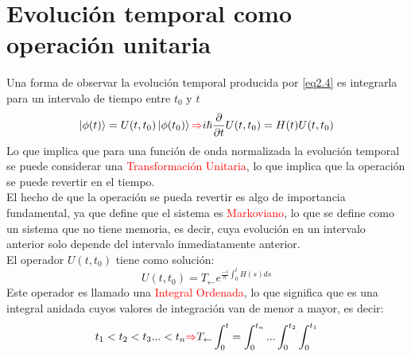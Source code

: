 \documentclass{book}
\begin{document}
\section{Evolución temporal como operación unitaria}
Una forma de observar la evolución temporal producida por \ref{eq2.4} es integrarla para un intervalo de tiempo entre $t_0$ y $t$
\begin{equation}\label{eq2.5}\ket{\phi(t)}=U(t,t_0)\ket{\phi(t_0)}\textcolor{red}{\Rightarrow} i \hslash \frac{\partial}{\partial t}U(t,t_0)=H(t)U(t,t_0)\end{equation}
Lo que implica que para una función de onda normalizada la evolución temporal se puede considerar una \textcolor{red}{Transformación Unitaria}, lo que implica que la operación se puede revertir en el tiempo.\\

El hecho de que la operación se pueda revertir es algo de importancia fundamental, ya que define que el sistema es \textcolor{red}{Markoviano}, lo que se define como un sistema que no tiene memoria, es decir, cuya evolución en un intervalo anterior solo depende del intervalo inmediatamente anterior. \\

El operador $U(t,t_0)$ tiene como solución:
\begin{equation}\label{eq2.6}U(t,t_0)=T_{\leftarrow}e^{\frac{-i}{\hslash}\int_0^t H(s)ds}\end{equation}
Este operador es llamado una \textcolor{red}{Integral Ordenada}, lo que significa que es una integral anidada cuyos valores de integración van de menor a mayor, es decir:
\begin{equation}\label{eq2.7}t_1<t_2<t_3...<t_n \textcolor{red}{\Rightarrow} T_{\leftarrow}\int_0^t=\int_0^{t_n}...\int_0^{t_2}\int_0^{t_1}\end{equation}
\end{document}

